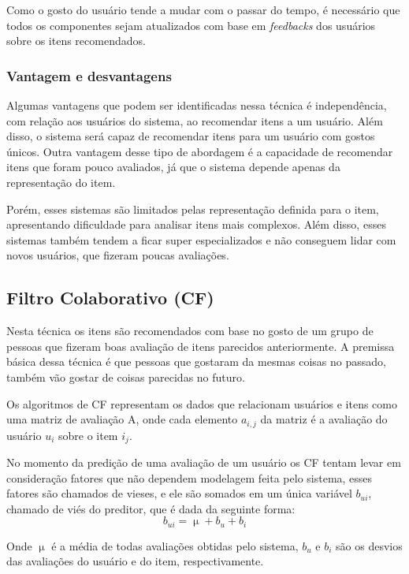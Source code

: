 Como o gosto do usuário tende a mudar com o passar do tempo, é necessário que todos os componentes sejam atualizados com base em \textit{feedbacks} dos usuários sobre os itens recomendados.
 
\subsubsection{Vantagem e desvantagens}

Algumas vantagens que podem ser identificadas nessa técnica é independência, com relação aos usuários do sistema, ao recomendar itens a um usuário. Além disso, o sistema será capaz de recomendar itens para um usuário com gostos únicos\cite{jain2015trends}. Outra vantagem desse tipo de abordagem é a capacidade de recomendar itens que foram pouco avaliados, já que o sistema depende apenas da representação do item.

Porém, esses sistemas são limitados pelas representação definida para o item, apresentando dificuldade para analisar itens mais complexos. Além disso, esses sistemas também tendem a ficar super especializados e não conseguem lidar com novos usuários, que fizeram poucas avaliações\cite{lops2011content}.

\subsection{Filtro Colaborativo (CF)}
Nesta técnica os itens são recomendados com base no gosto de um grupo de pessoas que fizeram boas avaliação de itens parecidos anteriormente. A premissa básica dessa técnica é que pessoas que gostaram da mesmas coisas no passado, também vão gostar de coisas parecidas no futuro\cite{shah2017recommender}.

Os algoritmos de CF  representam os dados que relacionam usuários e itens como uma matriz de avaliação A, onde cada elemento \(a_{i,j}\) da matriz é a avaliação do usuário \(u_i\) sobre o item \(i_j\)\cite{sarwar2001item}.

No momento da predição de uma avaliação de um usuário os CF tentam levar em consideração fatores que não dependem modelagem feita pelo sistema, esses fatores são chamados de vieses, e ele são somados em um única variável \(b_{ui}\), chamado de viés do preditor, que é dada da seguinte forma:
\begin{equation}
    b_{ui} = \upmu + b_u + b_i 
\end{equation}

Onde \(\upmu\) é a média de todas avaliações obtidas pelo sistema, \(b_u\) e \(b_i\) são os desvios das avaliações do usuário e do item, respectivamente.

